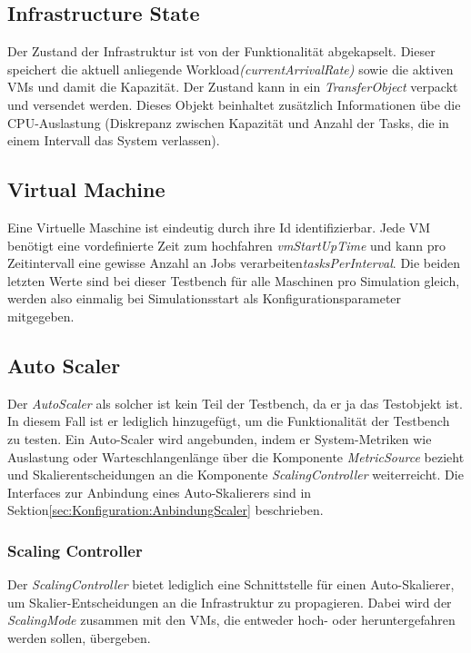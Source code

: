 \subsection{Infrastructure State}
\label{sec:aufbau:State}
Der Zustand der Infrastruktur ist von der Funktionalität abgekapselt. Dieser speichert die aktuell anliegende Workload\textit{(currentArrivalRate)} sowie die aktiven VMs und damit die Kapazität. Der Zustand kann in ein \textit{TransferObject} verpackt und versendet werden. Dieses Objekt beinhaltet zusätzlich Informationen übe die CPU-Auslastung (Diskrepanz zwischen Kapazität und Anzahl der Tasks, die in einem Intervall das System verlassen).

\subsection{Virtual Machine}
\label{sec:aufbau:VM}
Eine Virtuelle Maschine ist eindeutig durch ihre Id identifizierbar. Jede VM benötigt eine vordefinierte Zeit zum hochfahren \textit{vmStartUpTime} und kann pro Zeitintervall eine gewisse Anzahl an Jobs verarbeiten\textit{tasksPerInterval}. Die beiden letzten Werte sind bei dieser Testbench für alle Maschinen pro Simulation gleich, werden also einmalig bei Simulationsstart als Konfigurationsparameter mitgegeben.




\subsection{Auto Scaler}
Der \textit{AutoScaler} als solcher ist kein Teil der Testbench, da er ja das Testobjekt ist. In diesem Fall ist er lediglich hinzugefügt, um die Funktionalität der Testbench zu testen. Ein Auto-Scaler wird angebunden, indem er System-Metriken wie Auslastung oder Warteschlangenlänge über die Komponente \textit{MetricSource} bezieht und Skalierentscheidungen an die Komponente \textit{ScalingController} weiterreicht. Die Interfaces zur Anbindung eines Auto-Skalierers sind in Sektion\ref{sec:Konfiguration:AnbindungScaler} beschrieben.



\subsubsection{Scaling Controller}
Der \textit{ScalingController} bietet lediglich eine Schnittstelle für einen Auto-Skalierer, um Skalier-Entscheidungen an die Infrastruktur zu propagieren. Dabei wird der \textit{ScalingMode} zusammen mit den VMs, die entweder hoch- oder heruntergefahren werden sollen, übergeben.


